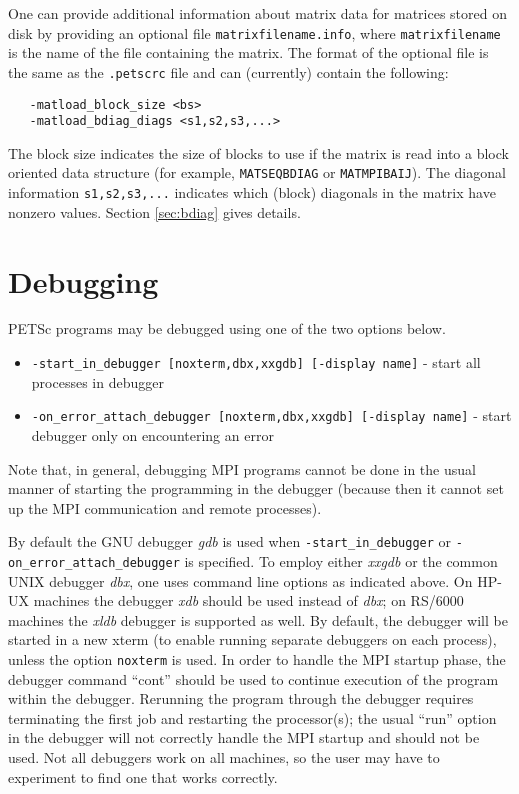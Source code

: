 One can provide additional information about matrix data for matrices
stored on disk by providing an optional file {\tt matrixfilename.info},
where {\tt matrixfilename} is the name of the file containing the matrix.
The format of the optional file is the same as the {\tt .petscrc} file 
and can (currently) contain the following:
\begin{verbatim}
   -matload_block_size <bs>
   -matload_bdiag_diags <s1,s2,s3,...>
\end{verbatim}
The block size indicates the size of blocks to use if the matrix is
read into a block oriented data structure (for example, 
{\tt MATSEQBDIAG} or {\tt MATMPIBAIJ}). The diagonal information 
{\tt s1,s2,s3,...} indicates
which (block) diagonals in the matrix have nonzero values.
Section \ref{sec:bdiag} gives details.

\section{Debugging}  \label{sec:debugging}

PETSc programs may be debugged using one of the two options below.
\begin{itemize}
\item {\tt -start\_in\_debugger [noxterm,dbx,xxgdb] [-display name]} 
     - start all processes in debugger
\item {\tt -on\_error\_attach\_debugger [noxterm,dbx,xxgdb]
      [-display name]} - start debugger only on encountering an error
\end{itemize}
Note that, in general, debugging MPI programs cannot be done in the usual
manner of starting the programming in the debugger (because then it cannot
set up the MPI communication and remote processes).

By default the GNU debugger {\em gdb} is used when {\tt -start\_in\_debugger}
or {\tt -on\_error\_attach\_debugger} is specified. 
To employ either {\em xxgdb} or the common UNIX debugger {\em dbx}, one uses
command line options as indicated above. On HP-UX machines the debugger
{\em xdb} should be used instead of {\em dbx}; on RS/6000 machines the
{\em xldb} debugger is supported as well.
By  default, the debugger will be started in a new xterm (to enable 
running separate debuggers on each process), unless the option 
{\tt noxterm} is used.
In order to handle the MPI startup phase, the debugger command ``cont'' 
should be used to continue execution of the program within the debugger.
Rerunning the program through the debugger requires terminating 
the first job and restarting the processor(s); the usual ``run'' 
option in the debugger will not correctly handle the MPI startup and
should not be used.  Not all debuggers work on all machines, so the user
may have to experiment to find one that works correctly.

